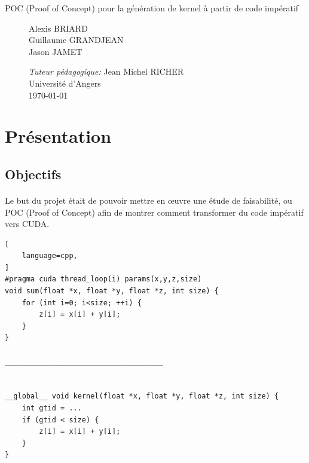 \documentclass{article}
\begin{document}
\begin{titlepage}
\begin{center}
\begin{Huge}
			\end{Huge}
			\begin{Large}
				POC (Proof of Concept) pour la génération de kernel à partir de code impératif
			\end{Large}		
			 
		\end{center}
		
		
  		\begin{figure}[b]
  		 \begin{minipage}{0.4\textwidth}
			\begin{flushleft} \large
				Alexis BRIARD\\
				Guillaume GRANDJEAN\\
				Jason JAMET
    		\end{flushleft}
    		\end{minipage}
    		\begin{minipage}{0.6\textwidth}
			\begin{flushright} \large
				\emph{Tuteur pédagogique:} Jean Michel RICHER\\				
        		Université d'Angers\\
        		\today
    		\end{flushright}
    	\end{minipage}
		\end{figure}

    	
	\end{titlepage}



\newpage
\thispagestyle{empty}
\mbox{}
\setcounter{page}{0}
\glsresetall
\newpage
\tableofcontents
\newpage

	\section{Présentation}

	\subsection{Objectifs}

	\paragraph{}
	Le but du projet était de pouvoir mettre en œuvre une étude de faisabilité, ou POC (Proof of Concept) afin de montrer comment transformer du code impératif vers CUDA.
	
	\begin{lstlisting}[
    language=cpp,
]
#pragma cuda thread_loop(i) params(x,y,z,size) 
void sum(float *x, float *y, float *z, int size) { 
	for (int i=0; i<size; ++i) {
		z[i] = x[i] + y[i];
	}
}

_____________________________________


__global__ void kernel(float *x, float *y, float *z, int size) { 
	int gtid = ...
	if (gtid < size) {
		z[i] = x[i] + y[i];
	}
}
	
	\end{lstlisting}	
	
\end{document}
